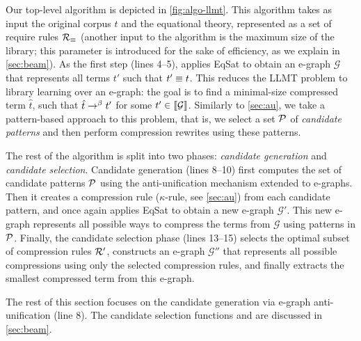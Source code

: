 
Our top-level algorithm  is depicted in \autoref{fig:algo-llmt}.
%
This algorithm takes as input the original corpus $t$ 
and the equational theory, represented as a set of require rules $\mathcal{R}_\equiv$
(another input to the algorithm is the maximum size of the library;
this parameter is introduced for the sake of efficiency, as we explain in \autoref{sec:beam}).
%
As the first step (lines 4--5),
 applies EqSat to obtain an e-graph $\mathcal{G}$ 
that represents all terms $t'$ such that $t' \equiv t$.
%
This reduces the LLMT problem to library learning over an e-graph:
\ie the goal is to find a minimal-size compressed term $\hat{t}$,
such that $\hat{t} \rightarrow^{\beta} t'$ for some $t' \in \llbracket \mathcal{G} \rrbracket$.
%
Similarly to \autoref{sec:au},
we take a pattern-based approach to this problem,
that is, we select a set $\mathcal{P}$ of \emph{candidate patterns}
and then perform compression rewrites using these patterns.

The rest of the algorithm is split into two phases:
\emph{candidate generation} and \emph{candidate selection}.
%
Candidate generation (lines 8--10)
first computes the set of candidate patterns $\mathcal{P}$ using the anti-unification mechanism extended to e-graphs.
%
Then it creates a compression rule ($\kappa$-rule, see \autoref{sec:au}) from each candidate pattern,
and once again applies EqSat to obtain a new e-graph $\mathcal{G}'$.
%
This new e-graph represents all possible ways to compress the terms from $\mathcal{G}$ 
using patterns in $\mathcal{P}$.
%
Finally, the candidate selection phase (lines 13--15)
selects the optimal subset of compression rules $\mathcal{R}'$,
constructs an e-graph $\mathcal{G}''$ that represents all possible compressions using only the selected compression rules,
and finally extracts the smallest compressed term from this e-graph.

The rest of this section focuses on the candidate generation via e-graph anti-unification
(line 8).
%
The candidate selection functions  and  are discussed in \autoref{sec:beam}.

